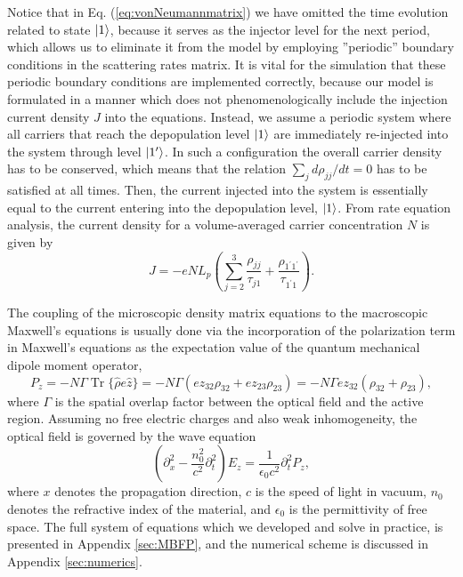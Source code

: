 \documentclass[10pt]{article}
\DeclareMathOperator{\Tr}{Tr}
\begin{document}
		Notice that in Eq. (\ref{eq:vonNeumannmatrix}) we have omitted the time
		evolution related to state $\Ket{1}$, because it serves as the injector level
		for the next period, which allows us to eliminate it from the model by
		employing ''periodic'' boundary conditions in the scattering rates matrix. It
		is vital for the simulation that these periodic boundary conditions are
		implemented correctly, because our model is formulated in a manner which does
		not phenomenologically include the injection current density $J$ into the
		equations. Instead, we assume a periodic system where all carriers that reach
		the depopulation level $\Ket{1}$ are immediately re-injected into the system
		through level $\Ket{1'}$. In such a configuration the overall carrier density
		has to be conserved, which means that the relation $\sum_{j}d\rho_{jj}/dt=0$
		has to be satisfied at all times. Then, the current injected into the system
		is essentially equal to the current entering into the depopulation level,
		$\Ket{1}$. From rate equation analysis, the current density for a volume-averaged carrier concentration $N$ is given by
		\cite{kumar2009coherence}
		\begin{equation}
			J=-eNL_{p}\left(  \sum_{j=2}^{3}\frac{\rho_{jj}}{\tau_{j1}}+\frac
			{\rho_{1^{\prime}1^{\prime}}}{\tau_{1^{\prime}1}}\right)  .
		\end{equation}
		
		The coupling of the microscopic density matrix equations to the macroscopic
		Maxwell's equations is usually done via the incorporation of the polarization
		term in Maxwell's equations as the expectation value of the quantum mechanical
		dipole moment operator,
		\begin{equation}
			P_{z}=-N\Gamma\Tr\{\hat{\rho}e\hat{z}\}=-N\Gamma(ez_{32}\rho_{32}+ez_{23}%
			\rho_{23})=-N\Gamma ez_{32}(\rho_{32}+\rho_{23}), \label{eq:fullpolarization}%
		\end{equation}
		where $\Gamma$ is the spatial overlap factor between the optical field and the
		active region. Assuming no free electric charges and also weak inhomogeneity,
		the optical field is governed by the wave equation
		\cite{boyd2003nonlinear,jirauschek2014modeling}
		\begin{equation}
			\left(  \partial_{x}^{2}-\frac{n_{0}^{2}}{c^{2}}\partial_{t}^{2}\right)
			E_{z}=\frac{1}{\epsilon_{0}c^{2}}\partial_{t}^{2}P_{z}, \label{eq:fullwave}%
		\end{equation}
		where $x$ denotes the propagation direction, $c$ is the speed of light in
		vacuum, $n_{0}$ denotes the refractive index of the material, and
		$\epsilon_{0}$ is the permittivity of free space. The full system of equations which we developed and solve in practice, is presented in Appendix \ref{sec:MBFP},
		 and the numerical scheme is discussed in Appendix \ref{sec:numerics}. 
	
\end{document}
